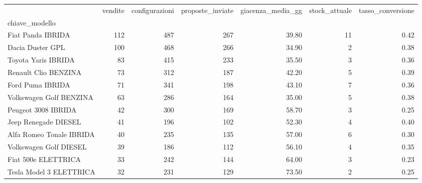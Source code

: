 \begin{tabular}{lrrrrrr}
\toprule
 & vendite & configurazioni & proposte_inviate & giacenza_media_gg & stock_attuale & tasso_conversione \\
chiave_modello &  &  &  &  &  &  \\
\midrule
Fiat Panda IBRIDA & 112 & 487 & 267 & 39.80 & 11 & 0.42 \\
Dacia Duster GPL & 100 & 468 & 266 & 34.90 & 2 & 0.38 \\
Toyota Yaris IBRIDA & 83 & 415 & 233 & 35.50 & 3 & 0.36 \\
Renault Clio BENZINA & 73 & 312 & 187 & 42.20 & 5 & 0.39 \\
Ford Puma IBRIDA & 71 & 341 & 198 & 43.10 & 7 & 0.36 \\
Volkswagen Golf BENZINA & 63 & 286 & 164 & 35.00 & 5 & 0.38 \\
Peugeot 3008 IBRIDA & 42 & 300 & 169 & 58.70 & 3 & 0.25 \\
Jeep Renegade DIESEL & 41 & 196 & 102 & 52.30 & 4 & 0.40 \\
Alfa Romeo Tonale IBRIDA & 40 & 235 & 135 & 57.00 & 6 & 0.30 \\
Volkswagen Golf DIESEL & 39 & 186 & 112 & 56.10 & 4 & 0.35 \\
Fiat 500e ELETTRICA & 33 & 242 & 144 & 64.00 & 3 & 0.23 \\
Tesla Model 3 ELETTRICA & 32 & 231 & 129 & 73.50 & 2 & 0.25 \\
\bottomrule
\end{tabular}
